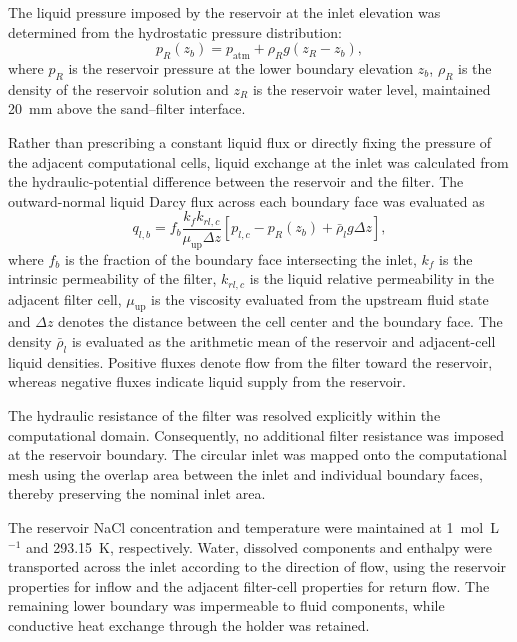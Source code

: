 \documentclass[final]{agujournal2019}
\begin{document}
The liquid pressure imposed by the reservoir at the inlet elevation was
determined from the hydrostatic pressure distribution:
\begin{equation}
p_R(z_b) = p_{\mathrm{atm}} + \rho_R g(z_R-z_b),
\label{eq:reservoir-pressure}
\end{equation}
where $p_R$ is the reservoir pressure at the lower boundary elevation $z_b$,
$\rho_R$ is the density of the reservoir solution and $z_R$ is the reservoir
water level, maintained 20~mm above the sand--filter interface.

Rather than prescribing a constant liquid flux or directly fixing the pressure
of the adjacent computational cells, liquid exchange at the inlet was
calculated from the hydraulic-potential difference between the reservoir and the
filter. The outward-normal liquid Darcy flux across each boundary face was
evaluated as
\begin{equation}
q_{l,b} =
f_b\frac{k_f k_{rl,c}}{\mu_{\mathrm{up}}\Delta z}
\left[
p_{l,c}-p_R(z_b)+\bar{\rho}_l g\Delta z
\right],
\label{eq:bottom-darcy-flux}
\end{equation}
where $f_b$ is the fraction of the boundary face intersecting the inlet, $k_f$
is the intrinsic permeability of the filter, $k_{rl,c}$ is the liquid relative
permeability in the adjacent filter cell, $\mu_{\mathrm{up}}$ is the viscosity
evaluated from the upstream fluid state and $\Delta z$ denotes the distance
between the cell center and the boundary face. The density $\bar{\rho}_l$ is
evaluated as the arithmetic mean of the reservoir and adjacent-cell liquid
densities. Positive fluxes denote flow from the filter toward the reservoir,
whereas negative fluxes indicate liquid supply from the reservoir.

The hydraulic resistance of the filter was resolved explicitly within the
computational domain. Consequently, no additional filter resistance was imposed
at the reservoir boundary. The circular inlet was mapped onto the computational
mesh using the overlap area between the inlet and individual boundary faces,
thereby preserving the nominal inlet area.

The reservoir NaCl concentration and temperature were maintained at
1~mol~L$^{-1}$ and 293.15~K, respectively. Water, dissolved components and
enthalpy were transported across the inlet according to the direction of flow,
using the reservoir properties for inflow and the adjacent filter-cell
properties for return flow. The remaining lower boundary was impermeable to
fluid components, while conductive heat exchange through the holder was
retained.
\end{document}
